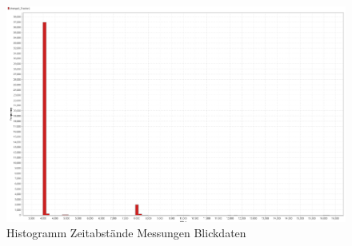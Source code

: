 \begin{figure}[H]
	\noindent \begin{centering}
		\includegraphics[width=15cm]{pics/HistogrammZeitenBlickdateien.png}
		\par\end{centering}
	\caption{\label{fig:HistogrammZeitenBlickdateien}Histogramm Zeitabst\"ande Messungen Blickdaten}
\end{figure}